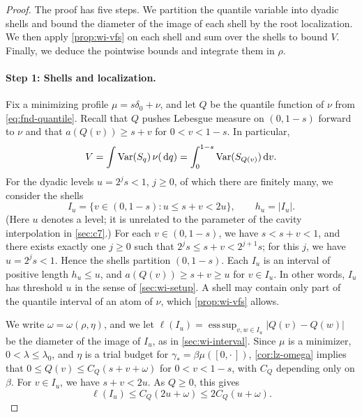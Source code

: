 \begin{proof}
The proof has five steps. We partition the quantile variable into dyadic
shells and bound the diameter of the image of each shell by the root
localization. We then apply \cref{prop:wi-vfs} on each shell and sum
over the shells to bound $V$. Finally, we deduce the pointwise bounds
and integrate them in $\rho$.

\paragraph{Step 1: Shells and localization.} Fix a minimizing profile
$\mu=s\delta_0+\nu$, and let $Q$ be the quantile function of $\nu$ from
\eqref{eq:fnd-quantile}. Recall that $Q$ pushes Lebesgue measure on
$(0,1-s)$ forward to $\nu$ and that $a(Q(v))\ge s+v$ for
$0<v<1-s$. In particular,
\begin{equation}\label{eq:sm-V-quantile}
 V=\int\operatorname{Var}(S_q)\,\nu(\,\mathrm d q)=\int_0^{1-s}\operatorname{Var}(S_{Q(v)})\,\mathrm d v .
\end{equation}
For the dyadic levels $u=2^js<1$, $j\ge0$, of which there are finitely
many, we consider the shells
\[
 I_u=\{v\in(0,1-s):u\le s+v<2u\},\qquad h_u=|I_u|.
\]
(Here $u$ denotes a level; it is unrelated to the parameter of the
cavity interpolation in \cref{sec:c7}.) For each $v\in(0,1-s)$, we have
$s<s+v<1$, and there exists exactly one $j\ge0$ such that
$2^js\le s+v<2^{j+1}s$; for this $j$, we have $u=2^js<1$. Hence the
shells partition $(0,1-s)$. Each $I_u$ is an interval of positive length
$h_u\le u$, and $a(Q(v))\ge s+v\ge u$ for $v\in I_u$. In other words,
$I_u$ has threshold $u$ in the sense of \cref{sec:wi-setup}. A shell may contain only
part of the quantile interval of an atom of $\nu$, which
\cref{prop:wi-vfs} allows.

We write $\omega=\omega(\rho,\eta)$, and we let
$\ell(I_u)=\operatorname*{ess\,sup}_{v,w\in I_u}|Q(v)-Q(w)|$ be the
diameter of the image of $I_u$, as in \cref{sec:wi-interval}. Since
$\mu$ is a minimizer, $0<\lambda\le\lambda_0$, and $\eta$ is a trial
budget for $\gamma_*=\beta\mu([0,\cdot\,])$, \cref{cor:lz-omega} implies
that $0\le Q(v)\le C_Q(s+v+\omega)$ for $0<v<1-s$, with $C_Q$ depending
only on $\beta$. For $v\in I_u$, we have $s+v<2u$. As $Q\ge0$, this
gives
\[
 \ell(I_u)\le C_Q(2u+\omega)\le2C_Q(u+\omega).
\]


\end{proof}
